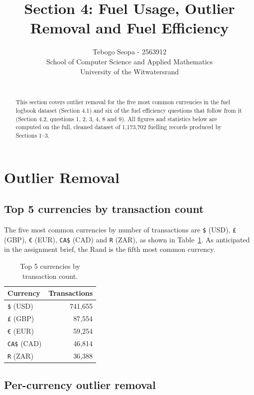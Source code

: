 \documentclass{article}
\title{Section 4: Fuel Usage, Outlier Removal and Fuel Efficiency}
\author{%
  Tebogo Seopa - 2563912\\
  School of Computer Science and Applied Mathematics \\
  University of the Witwatersrand \\
  \texttt{} \\
}
\begin{document}
\maketitle

\begin{abstract}
This section covers outlier removal for the five most common currencies in the fuel
logbook dataset (Section 4.1) and six of the fuel efficiency questions that follow
from it (Section 4.2, questions 1, 2, 3, 4, 8 and 9). All figures and statistics below
are computed on the full, cleaned dataset of 1{,}173{,}702 fuelling records produced by
Sections 1--3.
\end{abstract}

\section{Outlier Removal}
\label{sec:4.1}

\subsection{Top 5 currencies by transaction count}
\label{sec:4.1.1}

The five most common currencies by number of transactions are \texttt{\$} (USD),
\texttt{£} (GBP), \texttt{€} (EUR), \texttt{CA\$} (CAD) and \texttt{R} (ZAR), as shown in
Table~\ref{tab:top5}. As anticipated in the assignment brief, the Rand is the fifth most
common currency.

\begin{table}[h]
  \caption{Top 5 currencies by transaction count.}
  \label{tab:top5}
  \centering
  \begin{tabular}{lr}
    \toprule
    Currency & Transactions \\
    \midrule
    \texttt{\$} (USD) & 741{,}655 \\
    \texttt{£} (GBP) & 87{,}554 \\
    \texttt{€} (EUR) & 59{,}254 \\
    \texttt{CA\$} (CAD) & 46{,}814 \\
    \texttt{R} (ZAR) & 36{,}388 \\
    \bottomrule
  \end{tabular}
\end{table}

\subsection{Per-currency outlier removal}
\label{sec:4.1.2}
\end{document}
